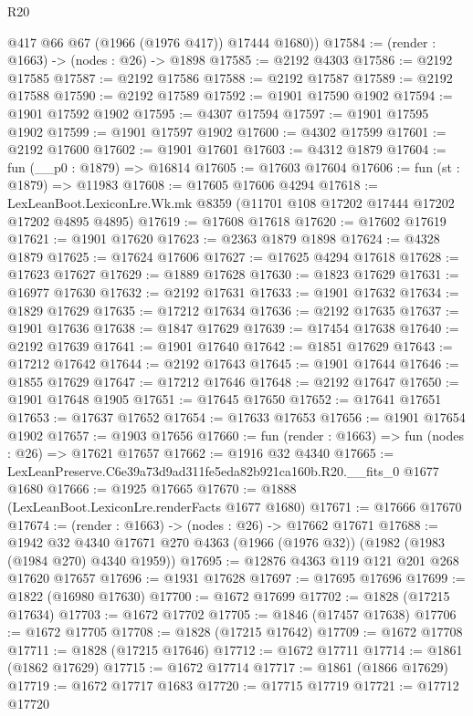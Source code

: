 \begin{lexlean}{R20}
\begin{coremodule}
        @417
        @66
        @67
        (@1966 (@1976 @417))
        @17444
        @1680))
@17584 := (render : @1663) -> (nodes : @26) -> @1898
@17585 := @2192 @4303
@17586 := @2192 @17585
@17587 := @2192 @17586
@17588 := @2192 @17587
@17589 := @2192 @17588
@17590 := @2192 @17589
@17592 := @1901 @17590 @1902
@17594 := @1901 @17592 @1902
@17595 := @4307 @17594
@17597 := @1901 @17595 @1902
@17599 := @1901 @17597 @1902
@17600 := @4302 @17599
@17601 := @2192 @17600
@17602 := @1901 @17601
@17603 := @4312 @1879
@17604 := fun (__p0 : @1879) => @16814
@17605 := @17603 @17604
@17606 := fun (st : @1879) => @11983
@17608 := @17605 @17606 @4294
@17618 := LexLeanBoot.LexiconLre.Wk.mk @8359 (@11701 @108 @17202 @17444 @17202 @17202 @4895 @4895)
@17619 := @17608 @17618
@17620 := @17602 @17619
@17621 := @1901 @17620
@17623 := @2363 @1879 @1898
@17624 := @4328 @1879
@17625 := @17624 @17606
@17627 := @17625 @4294 @17618
@17628 := @17623 @17627
@17629 := @1889 @17628
@17630 := @1823 @17629
@17631 := @16977 @17630
@17632 := @2192 @17631
@17633 := @1901 @17632
@17634 := @1829 @17629
@17635 := @17212 @17634
@17636 := @2192 @17635
@17637 := @1901 @17636
@17638 := @1847 @17629
@17639 := @17454 @17638
@17640 := @2192 @17639
@17641 := @1901 @17640
@17642 := @1851 @17629
@17643 := @17212 @17642
@17644 := @2192 @17643
@17645 := @1901 @17644
@17646 := @1855 @17629
@17647 := @17212 @17646
@17648 := @2192 @17647
@17650 := @1901 @17648 @1905
@17651 := @17645 @17650
@17652 := @17641 @17651
@17653 := @17637 @17652
@17654 := @17633 @17653
@17656 := @1901 @17654 @1902
@17657 := @1903 @17656
@17660 := fun (render : @1663) => fun (nodes : @26) => @17621 @17657
@17662 := @1916 @32 @4340
@17665 := LexLeanPreserve.C6e39a73d9ad311fe5eda82b921ca160b.R20.__fits_0 @1677 @1680
@17666 := @1925 @17665
@17670 := @1888 (LexLeanBoot.LexiconLre.renderFacts @1677 @1680)
@17671 := @17666 @17670
@17674 := (render : @1663) -> (nodes : @26) -> @17662 @17671
@17688 := @1942
    @32
    @4340
    @17671
    @270
    @4363
    (@1966 (@1976 @32))
    (@1982 (@1983 (@1984 @270) @4340 @1959))
@17695 := @12876 @4363 @119 @121 @201 @268 @17620 @17657
@17696 := @1931 @17628
@17697 := @17695 @17696
@17699 := @1822 (@16980 @17630)
@17700 := @1672 @17699
@17702 := @1828 (@17215 @17634)
@17703 := @1672 @17702
@17705 := @1846 (@17457 @17638)
@17706 := @1672 @17705
@17708 := @1828 (@17215 @17642)
@17709 := @1672 @17708
@17711 := @1828 (@17215 @17646)
@17712 := @1672 @17711
@17714 := @1861 (@1862 @17629)
@17715 := @1672 @17714
@17717 := @1861 (@1866 @17629)
@17719 := @1672 @17717 @1683
@17720 := @17715 @17719
@17721 := @17712 @17720

\end{coremodule}
\end{lexlean}
